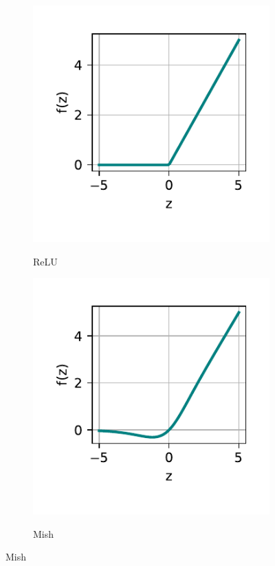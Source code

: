 \begin{figure}[h!]
\begin{subfigure}[H]{.4\textwidth}
        \centering
        \caption{ReLU}
        \includegraphics[scale=0.8]{img/img-fundamentacao-relu.pdf}
        \label{fig:fund-funcs-relu}
    \end{subfigure}
    \begin{subfigure}[H]{.4\textwidth}
        \centering
        \caption{Mish}
        \includegraphics[scale=0.8]{img/img-fundamentacao-mish.pdf}
        \label{fig:fund-funcs-mish}
    \end{subfigure}
	\label{fig:fund-funcs}
\end{figure}

